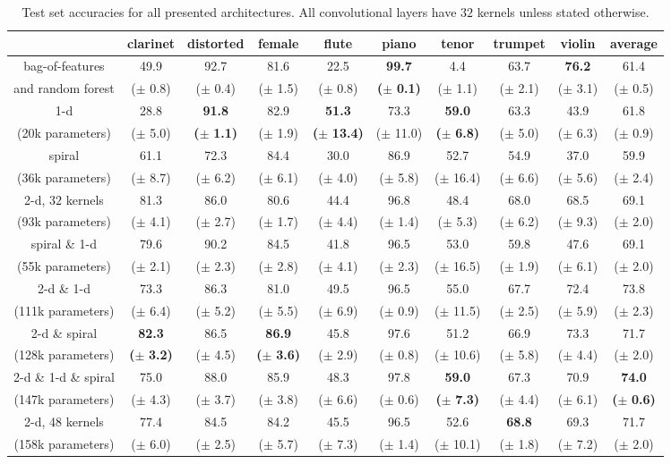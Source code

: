 \documentclass{article}
\newcommand*{\s}[1]{\small{($\pm$ #1)}}
\newcommand*{\g}[1]{\small{\textbf{(}$\boldsymbol{\pm}$ \textbf{#1}\textbf{)}}}
\begin{document}
\begin{table}[t]
	\begin{center}
	\setlength{\unitlength}{1cm}
	\begin{tabular}{|c|cccccccc|c|}
		\hline
		& clarinet & distorted & female & flute & piano & tenor & trumpet & violin & average \\
		\hline
		bag-of-features
		& 49.9 & 92.7 & 81.6 & 22.5 & \textbf{99.7} & \hphantom{0}4.4 & 63.7 & \textbf{76.2} & 61.4 \\
		and random forest
		&\s{0.8}&\s{0.4}&\s{1.5}&\s{0.8}&\g{0.1}&\s{1.1}&\s{2.1}&\s{3.1}&\s{0.5}\\
		\hline
		1-d
		& 28.8 & \textbf{91.8} & 82.9 & \textbf{51.3} & 73.3 & \textbf{59.0} & 63.3 & 43.9 & 61.8 \\
		(20k parameters)
		&\s{5.0}&\g{1.1}&\s{1.9}&\g{13.4}&\s{11.0}&\g{6.8}&\s{5.0}&\s{6.3}&\s{0.9} \\
		\hline
		spiral
		& 61.1 & 72.3 & 84.4 & 30.0 & 86.9 & 52.7 & 54.9 & 37.0 & 59.9 \\
		(36k parameters)
		&\s{8.7}&\s{6.2}&\s{6.1}&\s{4.0}&\s{5.8}&\s{16.4}&\s{6.6}&\s{5.6}&\s{2.4}\\	
		\hline
		2-d, $32$ kernels
		& 81.3 & 86.0 & 80.6 & 44.4 & 96.8 & 48.4 & 68.0 & 68.5 & 69.1 \\		
		(93k parameters)
		&\s{4.1}&\s{2.7}&\s{1.7}&\s{4.4}&\s{1.4}&\s{5.3}&\s{6.2}&\s{9.3}&\s{2.0} \\
		\hline
		spiral \& 1-d
		& 79.6 & 90.2 & 84.5 & 41.8 & 96.5 & 53.0 & 59.8 & 47.6 & 69.1 \\
		(55k parameters)
		&\s{2.1}&\s{2.3}&\s{2.8}&\s{4.1}&\s{2.3}&\s{16.5}&\s{1.9}&\s{6.1}&\s{2.0}\\
		\hline
		2-d \& 1-d
		& 73.3 & 86.3 & 81.0 & 49.5 & 96.5 & 55.0 & 67.7 & 72.4 & 73.8 \\
		(111k parameters)
		&\s{6.4}&\s{5.2}&\s{5.5}&\s{6.9}&\s{0.9}&\s{11.5}&\s{2.5}&\s{5.9}&\s{2.3}\\
		\hline
		2-d \& spiral
		& \textbf{82.3} & 86.5 & \textbf{86.9} & 45.8 & 97.6 & 51.2 & 66.9 & 73.3 & 71.7 \\
		(128k parameters)
		&\g{3.2}&\s{4.5}&\g{3.6}&\s{2.9}&\s{0.8}&\s{10.6}&\s{5.8}&\s{4.4}&\s{2.0}\\
		\hline
		2-d \& 1-d \& spiral
		& 75.0 & 88.0 & 85.9 & 48.3 & 97.8 & \textbf{59.0} & 67.3 & 70.9 & \textbf{74.0}  \\
		(147k parameters)
		&\s{4.3}&\s{3.7}&\s{3.8}&\s{6.6}&\s{0.6}&\g{7.3}&\s{4.4}&\s{6.1}&\g{0.6}\\
		\hline
		2-d, 48 kernels
		& 77.4 & 84.5 & 84.2 & 45.5 & 96.5 & 52.6 & \textbf{68.8} & 69.3 & 71.7\\
		(158k parameters)
		&\s{6.0}&\s{2.5}&\s{5.7}&\s{7.3}&\s{1.4}&\s{10.1}&\s{1.8}&\s{7.2}&\s{2.0}\\
		\hline
	\end{tabular}
	\end{center}
	\caption{Test set accuracies for all presented architectures. All convolutional layers
	have $32$ kernels unless stated otherwise.
	\label{table:results}}
\end{table}
\end{document}

